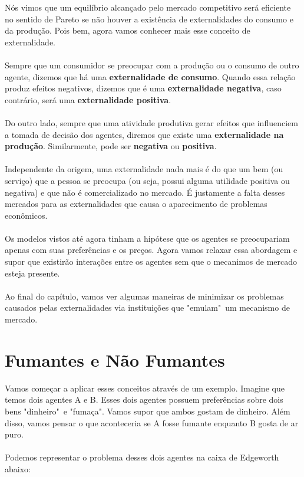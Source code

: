 \documentclass[a4paper,11pt,oneside]{book}
\theoremstyle{definition}
\theoremstyle{break}
\begin{document}
Nós vimos que um equilíbrio alcançado pelo mercado competitivo será eficiente no sentido de Pareto se não houver a existência de externalidades do consumo e da produção. Pois bem, agora vamos conhecer mais esse conceito de externalidade.
\\~\\
Sempre que um consumidor se preocupar com a produção ou o consumo de outro agente, dizemos que há uma \textbf{externalidade de consumo}. Quando essa relação produz efeitos negativos, dizemos que é uma \textbf{externalidade negativa}, caso contrário, será uma \textbf{externalidade positiva}.
\\~\\
Do outro lado, sempre que uma atividade produtiva gerar efeitos que influenciem a tomada de decisão dos agentes, diremos que existe uma \textbf{externalidade na produção}. Similarmente, pode ser \textbf{negativa} ou \textbf{positiva}.
\\~\\
Independente da origem, uma externalidade nada mais é do que um bem (ou serviço) que a pessoa se preocupa (ou seja, possui alguma utilidade positiva ou negativa) e que não é comercializado no mercado. É justamente a falta desses mercados para as externalidades que causa o aparecimento de problemas econômicos.
\\~\\
Os modelos vistos até agora tinham a hipótese que os agentes se preocupariam apenas com suas preferências e os preços. Agora vamos relaxar essa abordagem e supor que existirão interações entre os agentes sem que o mecanimos de mercado esteja presente.
\\~\\
Ao final do capítulo, vamos ver algumas maneiras de minimizar os problemas causados pelas externalidades via instituições que "emulam"\ um mecanismo de mercado.

\section{Fumantes e Não Fumantes}

Vamos começar a aplicar esses conceitos através de um exemplo. Imagine que temos dois agentes A e B. Esses dois agentes possuem preferências sobre dois bens "dinheiro"\ e "fumaça". Vamos supor que ambos gostam de dinheiro. Além disso, vamos pensar o que aconteceria se A fosse fumante enquanto B gosta de ar puro.
\\~\\
Podemos representar o problema desses dois agentes na caixa de Edgeworth abaixo:
\end{document}
